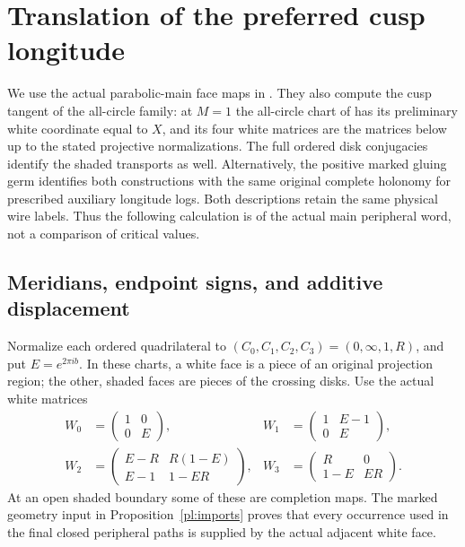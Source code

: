 \section{Translation of the preferred cusp longitude}\label{pl:cusp}

We use the actual parabolic-main face maps in \cite[Section 7]{StrictGeometry}.
They also compute the cusp tangent of the all-circle family: at $M=1$
the all-circle chart of \cite{Nonparabolic} has its preliminary white
coordinate equal to $X$, and its four white matrices are the matrices
below up to the stated projective normalizations. The full ordered disk
conjugacies identify the shaded transports as well. Alternatively, the
positive marked gluing germ identifies both constructions with the same
original complete holonomy for prescribed auxiliary longitude logs.
Both descriptions retain the same physical wire labels. Thus the
following calculation is of the actual main peripheral word, not a
comparison of critical values.

\subsection{Meridians, endpoint signs, and additive
displacement}\label{meridians-endpoint-signs-and-additive-displacement}

Normalize each ordered quadrilateral to
\((C_0,C_1,C_2,C_3)=(0,\infty,1,R)\), and put \(E=e^{2\pi i b}\). In
these charts, a white face is a piece of an original projection region;
the other, shaded faces are pieces of the crossing disks. Use the actual
white matrices \begin{equation}
\begin{aligned}
W_0&=\begin{pmatrix}1&0\\0&E\end{pmatrix},
&W_1&=\begin{pmatrix}1&E-1\\0&E\end{pmatrix},\\
W_2&=\begin{pmatrix}E-R&R(1-E)\\E-1&1-ER\end{pmatrix},
&W_3&=\begin{pmatrix}R&0\\1-E&ER\end{pmatrix}.
\end{aligned}
\label{plc:4}
\end{equation} At an open shaded boundary some of these are completion maps. The
marked geometry input in Proposition~\ref{pl:imports} proves that every occurrence used in the final
closed peripheral paths is supplied by the actual adjacent white face.

